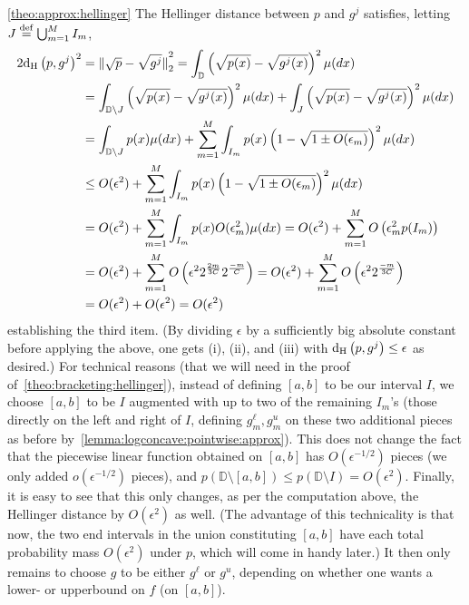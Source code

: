 \documentclass[11pt]{article}
\newcommand{\new}[1]{{\color{red} #1}}
\newcommand{\new}[1]{{#1}}
\theoremstyle{definition}
\newcommand{\eps}{\epsilon}
\newcommand{\norm}[1]{\lVert#1\rVert}
\newcommand{\eqdef}{\stackrel{{\mathrm {\footnotesize def}}}{=}}
\newcommand{\normtwo}[1]{{\norm{#1}}_2}
\newcommand{\bigO}[1]{{O\left( #1 \right)}}
\newcommand{\hellinger}[2]{{\operatorname{d_{\rm{}H}}\left({#1, #2}\right)}}
\begin{document}
\begin{proofof}{\cref{theo:approx:hellinger}}
The Hellinger distance between $p$ and $g^j$ satisfies, letting $J\eqdef \bigcup_{m=1}^M I_m$,
\begin{align*}
  2\hellinger{p}{g^j}^2 &= \normtwo{\sqrt{p}-\sqrt{g^j}}^2
    = \int_{\mathbb{D}}\left(\sqrt{p(x)}-\sqrt{g^j(x)}\right)^2 \mu(dx) \\
    &= \int_{\mathbb{D}\setminus J}\left(\sqrt{p(x)}-\sqrt{g^j(x)}\right)^2 \mu(dx)+\int_{J}\left(\sqrt{p(x)}-\sqrt{g^j(x)}\right)^2 \mu(dx)\\
    &= \int_{\mathbb{D}\setminus J}p(x) \mu(dx)+\sum_{m=1}^M\int_{I_m}p(x)\left(1-\sqrt{1\pm O(\eps_m)}\right)^2 \mu(dx)\\
    &\leq O(\eps^2) + \sum_{m=1}^M\int_{I_m}p(x)\left(1-\sqrt{1\pm O(\eps_m)}\right)^2 \mu(dx) \\
    &= O(\eps^2) + \sum_{m=1}^M\int_{I_m}p(x)O(\eps_m^2) \mu(dx) 
    = O(\eps^2) + \sum_{m=1}^M \bigO{\eps_m^2 p(I_m)} \\
    &= O(\eps^2) + \sum_{m=1}^M \bigO{\eps^2 2^{\frac{2m}{3C}}2^{\frac{-m}{C}}} 
    = O(\eps^2) + \sum_{m=1}^M \bigO{\eps^2 2^{\frac{-m}{3C}}} \\
    &= O(\eps^2) + O(\eps^2) = O(\eps^2)
\end{align*}
establishing the third item. (By dividing $\eps$ by a sufficiently big absolute constant before applying the above, one gets (i), (ii), and (iii) with $\hellinger{p}{g^j} \leq \eps$ as desired.) \new{For technical reasons (that we will need in the proof of~\cref{theo:bracketing:hellinger}), instead of defining $[a,b]$ to be our interval $I$, we choose $[a,b]$ to be $I$ augmented with up to two of the remaining $I_m$'s (those directly on the left and right of $I$, defining $g^\ell_m, g^u_m$ on these two additional pieces as before by~\cref{lemma:logconcave:pointwise:approx}). This does not change the fact that the piecewise linear function obtained on $[a,b]$ has $O(\eps^{-1/2})$ pieces (we only added $o(\eps^{-1/2})$ pieces), and $p(\mathbb{D}\setminus [a,b])\leq p(\mathbb{D}\setminus I) = O(\eps^2)$. Finally, it is easy to see that this only changes, as per the computation above, the Hellinger distance by $O(\eps^2)$ as well. (The advantage of this technicality is that now, the two end intervals in the union constituting  $[a,b]$ have each total probability mass $O(\eps^2)$ under $p$, which will come in handy later.)} It then only remains to choose $g$ to be either $g^\ell$ or $g^u$, depending on whether one wants a lower- or upperbound on $f$ (on $[a,b]$).
\end{proofof}
\end{document}

